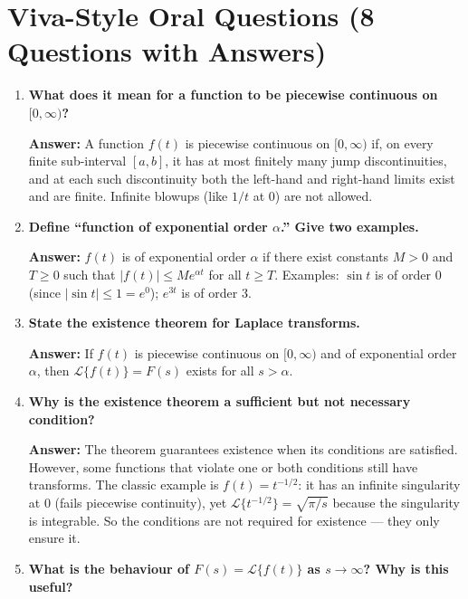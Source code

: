 \documentclass[12pt,a4paper]{article}
\begin{document}
\section{Viva-Style Oral Questions (8 Questions with Answers)}

\begin{enumerate}[label=\textbf{Q\arabic*.}]

\item \textbf{What does it mean for a function to be piecewise continuous on $[0, \infty)$?}

\textbf{Answer:} A function $f(t)$ is piecewise continuous on $[0,\infty)$ if, on every finite sub-interval $[a,b]$, it has at most finitely many jump discontinuities, and at each such discontinuity both the left-hand and right-hand limits exist and are finite. Infinite blowups (like $1/t$ at 0) are not allowed.

\item \textbf{Define ``function of exponential order $\alpha$.'' Give two examples.}

\textbf{Answer:} $f(t)$ is of exponential order $\alpha$ if there exist constants $M > 0$ and $T \geq 0$ such that $|f(t)| \leq M e^{\alpha t}$ for all $t \geq T$. Examples: $\sin t$ is of order 0 (since $|\sin t| \leq 1 = e^0$); $e^{3t}$ is of order 3.

\item \textbf{State the existence theorem for Laplace transforms.}

\textbf{Answer:} If $f(t)$ is piecewise continuous on $[0,\infty)$ and of exponential order $\alpha$, then $\mathcal{L}\{f(t)\} = F(s)$ exists for all $s > \alpha$.

\item \textbf{Why is the existence theorem a sufficient but not necessary condition?}

\textbf{Answer:} The theorem guarantees existence when its conditions are satisfied. However, some functions that violate one or both conditions still have transforms. The classic example is $f(t) = t^{-1/2}$: it has an infinite singularity at 0 (fails piecewise continuity), yet $\mathcal{L}\{t^{-1/2}\} = \sqrt{\pi/s}$ because the singularity is integrable. So the conditions are not required for existence --- they only ensure it.

\item \textbf{What is the behaviour of $F(s) = \mathcal{L}\{f(t)\}$ as $s \to \infty$? Why is this useful?}


\end{enumerate}
\end{document}
